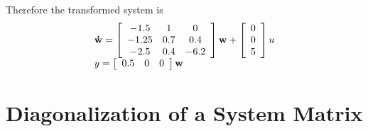 Therefore the transformed system is
\[
\begin{array}{l}
 {\bf{\dot w}} = \left[ {\begin{array}{*{20}c}
   { - 1.5} & 1 & 0  \\
   { - 1.25} & {0.7} & {0.4}  \\
   { - 2.5} & { 0.4} & {-6.2}  \\
\end{array}} \right]{\bf{w}} + \left[ {\begin{array}{*{20}c}
   0  \\
   0  \\
   5  \\
\end{array}} \right]u \\
 y = \left[ {\begin{array}{*{20}c}
   {0.5} & 0 & 0  \\
\end{array}} \right]{\bf{w}} \\
 \end{array}
\]



\section*{Diagonalization of a System Matrix} %
\label{sec:diagonalization_of_a_system_matrix}

